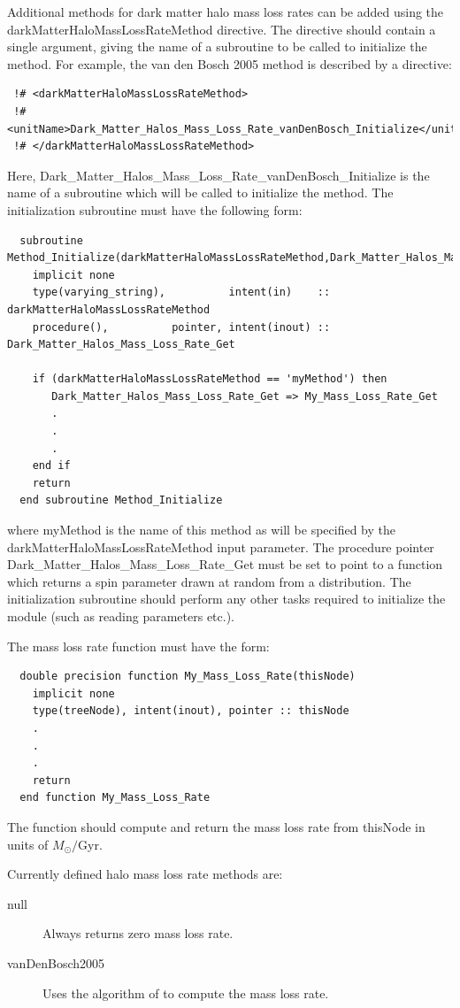 Additional methods for dark matter halo mass loss rates can be added using the {\normalfont \ttfamily darkMatterHaloMassLossRateMethod} directive. The directive should contain a single argument, giving the name of a subroutine to be called to initialize the method. For example, the {\normalfont \ttfamily van den Bosch 2005} method is described by a directive:
\begin{verbatim}
 !# <darkMatterHaloMassLossRateMethod>
 !#  <unitName>Dark_Matter_Halos_Mass_Loss_Rate_vanDenBosch_Initialize</unitName>
 !# </darkMatterHaloMassLossRateMethod>
\end{verbatim}
Here, {\normalfont \ttfamily Dark\_Matter\_Halos\_Mass\_Loss\_Rate\_vanDenBosch\_Initialize} is the name of a subroutine which will be called to initialize the method. The initialization subroutine must have the following form:
\begin{verbatim}
  subroutine Method_Initialize(darkMatterHaloMassLossRateMethod,Dark_Matter_Halos_Mass_Loss_Rate_Get)
    implicit none
    type(varying_string),          intent(in)    :: darkMatterHaloMassLossRateMethod
    procedure(),          pointer, intent(inout) :: Dark_Matter_Halos_Mass_Loss_Rate_Get
    
    if (darkMatterHaloMassLossRateMethod == 'myMethod') then
       Dark_Matter_Halos_Mass_Loss_Rate_Get => My_Mass_Loss_Rate_Get
       .
       .
       .
    end if
    return
  end subroutine Method_Initialize
\end{verbatim}
where {\normalfont \ttfamily myMethod} is the name of this method as will be specified by the {\normalfont \ttfamily darkMatterHaloMassLossRateMethod} input parameter. The procedure pointer {\normalfont \ttfamily Dark\_Matter\_Halos\_Mass\_Loss\_Rate\_Get} must be set to point to a function which returns a spin parameter drawn at random from a distribution. The initialization subroutine should perform any other tasks required to initialize the module (such as reading parameters etc.).

The mass loss rate function must have the form:
\begin{verbatim}
  double precision function My_Mass_Loss_Rate(thisNode)
    implicit none
    type(treeNode), intent(inout), pointer :: thisNode
    .
    .
    .
    return
  end function My_Mass_Loss_Rate
\end{verbatim}
The function should compute and return the mass loss rate from {\normalfont \ttfamily thisNode} in units of $M_\odot/$Gyr.

Currently defined halo mass loss rate methods are:
\begin{description}
 \item [{\normalfont \ttfamily null}] Always returns zero mass loss rate.
 \item [{\normalfont \ttfamily vanDenBosch2005}] Uses the algorithm of \cite{van_den_bosch_mass_2005} to compute the mass loss rate.
\end{description}

